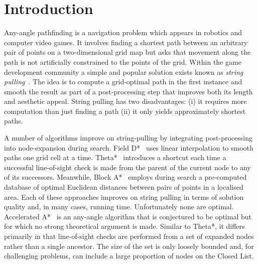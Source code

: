 \section{Introduction}
Any-angle pathfinding is a navigation problem which appears in robotics
and computer video games. It involves finding a shortest path between an 
arbitrary pair of points on a two-dimensional grid map but asks that 
movement along the path is not artificially constrained to the points of 
the grid.  Within the game development community a simple and popular 
solution exists known as \emph{string pulling}~\cite{pinter01,botea04}.
The idea is to compute a grid-optimal path in the first
instance and smooth the result as part of a post-processing step that improves
both its length and aesthetic appeal. String pulling has two disadvantages: 
(i) it requires more computation than just finding a path (ii)
it only yields approximately shortest paths.

A number of algorithms improve on string-pulling by integrating post-processing
into node-expansion during search. Field D*~\cite{ferguson05} uses linear 
interpolation to smooth paths one grid cell at a time. 
Theta*~\cite{nash07} 
introduces a shortcut each time a successful line-of-sight check
is made from the parent of the current node to any of its successors.
Meanwhile, Block A*~\cite{yap11} employs during search a pre-computed database
of optimal Euclidean distances between pairs of points in a localised area.
Each of these approaches improves on string pulling in terms of solution 
quality and, in many cases, running time. Unfortunately none are optimal.
Accelerated A*~\cite{sislak09b} is an any-angle algorithm that is conjectured 
to be optimal but for which no strong theoretical argument is made. Similar to Theta*, 
it differs primarily in that line-of-sight checks are performed from a set
of expanded nodes rather than a single ancestor. The size of the set is only
loosely bounded and, for challenging problems, can include a large proportion
of nodes on the Closed List.

